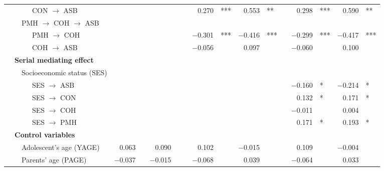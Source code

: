 {\begin{tabular}{llll r@{\hskip -0.1mm}l r@{\hskip -0.1mm}l c r@{\hskip -0.1mm}l r@{\hskip -0.1mm}l c r@{\hskip -0.1mm}l r@{\hskip -0.1mm}l}
      &       &       & CON $\longrightarrow$ ASB &       &       &       &       &       & 0.270 & ***   & 0.553 & **   &       & 0.298 & ***   & 0.590 & ** \\
      &       & \multicolumn{2}{l}{PMH $\longrightarrow$ COH $\longrightarrow$ ASB} &       &       &       &       &       &       &       &       &       &       &       &       &       &  \\
      &       &       & PMH $\longrightarrow$ COH &       &       &       &       &       & $-$0.301 & ***   & $-$0.416 & ***   &       & $-$0.299 & ***   & $-$0.417 & *** \\
      &       &       & COH $\longrightarrow$ ASB &       &       &       &       &       & $-$0.056 &       & 0.097 &       &       & $-$0.060 &       & 0.100 &  \\
      & \multicolumn{3}{l}{\textbf{Serial mediating effect}} &       &       &       &       &       &       &       &       &       &       &       &       &       &  \\
      &       & \multicolumn{2}{l}{Socioeconomic status (SES)} &       &       &       &       &       &       &       &       &       &       &       &       &       &  \\
      &       &       & SES $\longrightarrow$ ASB &       &       &       &       &       &       &       &       &       &       & $-$0.160 & *     & $-$0.214 & * \\
      &       &       & SES $\longrightarrow$ CON &       &       &       &       &       &       &       &       &       &       & 0.132 & *     & 0.171 & * \\
      &       &       & SES $\longrightarrow$ COH &       &       &       &       &       &       &       &       &       &       & $-$0.011 &       & 0.004 &  \\
      &       &       & SES $\longrightarrow$ PMH &       &       &       &       &       &       &       &       &       &       & 0.171 & *     & 0.193 & * \\
      & \multicolumn{3}{l}{\textbf{Control variables}} &       &       &       &       &       &       &       &       &       &       &       &       &       &  \\
      &       & \multicolumn{2}{l}{Adolescent's age (YAGE)} & 0.063 &       & 0.090 &       &       & 0.102 &       & $-$0.015 &       &       & 0.109 &       & $-$0.004 &  \\
      &       & \multicolumn{2}{l}{Parents' age (PAGE)} & $-$0.037 &       & $-$0.015 &       &       & $-$0.068 &       & 0.039 &       &       & $-$0.064 &       & 0.033 &  \\

\end{tabular}}
